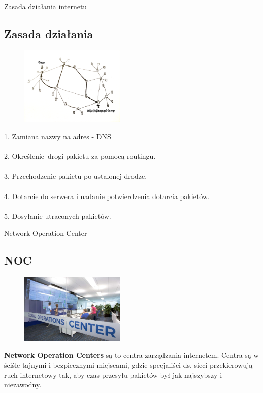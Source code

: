 \documentclass{beamer}
\begin{document}
	\begin{frame}{Zasada działania internetu}
		\subsection{Zasada działania}
		\begin{figure}
			\vspace{-10pt}
			\includegraphics[width=5cm]{internet_2.png}
		\end{figure}
			1. Zamiana nazwy na adres - DNS \\ ~
			\\ 2. Określenie~drogi pakietu za pomocą routingu.\\ ~
			\\ 3. Przechodzenie pakietu po ustalonej drodze.\\ ~
			\\ 4. Dotarcie do serwera i nadanie potwierdzenia dotarcia pakietów.\\ ~
			\\ 5. Dosyłanie utraconych pakietów.
	\end{frame}
	\begin{frame}{Network Operation Center}
		\subsection{NOC}
		\begin{figure}
			\includegraphics[width=5cm]{noc.jpg}
		\end{figure}
		\textbf{Network Operation Centers} są to centra zarządzania internetem. Centra są w ściśle tajnymi i bezpiecznymi miejscami, gdzie specjaliści ds. sieci przekierowują ruch internetowy tak, aby czas przesyłu pakietów był jak najszybszy i niezawodny. 
	\end{frame}
\end{document}
